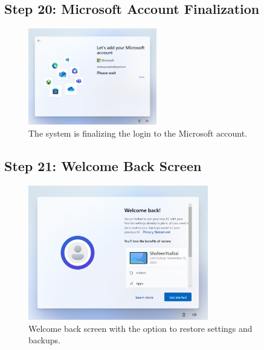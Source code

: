 \documentclass{article}
\begin{document}
\subsection{Step 20: Microsoft Account Finalization}
\begin{figure}[H]
    \centering
    \includegraphics[width=0.5\textwidth]{2024-09-17_15-25-23.png}
    \caption{The system is finalizing the login to the Microsoft account.}
\end{figure}

\subsection{Step 21: Welcome Back Screen}
\begin{figure}[H]
    \centering
    \includegraphics[width=0.7\textwidth]{2024-09-17_15-25-49.png}
    \caption{Welcome back screen with the option to restore settings and backups.}
    \label{fig:welcome_back}
\end{figure}
\end{document}
